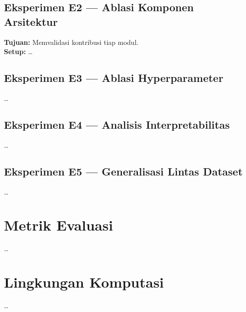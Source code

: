 \subsection*{Eksperimen E2 — Ablasi Komponen Arsitektur}
\textbf{Tujuan:} Memvalidasi kontribusi tiap modul.\\
\textbf{Setup:} \dots

\subsection*{Eksperimen E3 — Ablasi Hyperparameter}
\dots

\subsection*{Eksperimen E4 — Analisis Interpretabilitas}
\dots

\subsection*{Eksperimen E5 — Generalisasi Lintas Dataset}
\dots

\section{Metrik Evaluasi}
\label{subsec:bab4_metrik}
\dots

\section{Lingkungan Komputasi}
\label{subsec:bab4_komputasi}
\dots
